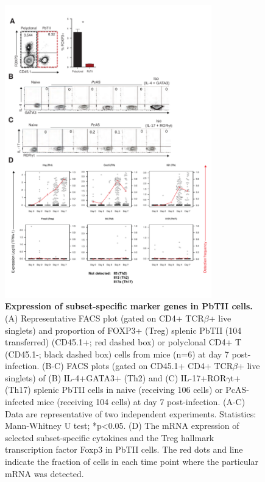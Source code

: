 \begin{figure}
    \centering
    \includegraphics[width=0.8\textwidth]{"Fig S4 rev3"}
    \caption[Expression of subset-specific marker genes in PbTII cells]{\textbf{Expression of subset-specific marker genes in PbTII cells.} (A) Representative FACS plot (gated on CD4+ TCR\( \beta \)+ live singlets) and proportion of FOXP3+ (Treg) splenic PbTII (104 transferred) (CD45.1+; red dashed box) or polyclonal CD4+ T (CD45.1-; black dashed box) cells from mice (n=6) at day 7 post-infection. (B-C) FACS plots (gated on CD45.1+ CD4+ TCR\( \beta \)+ live singlets) of (B) IL-4+GATA3+ (Th2) and (C) IL-17+ROR\( \gamma \)t+ (Th17) splenic PbTII cells in naive (receiving 106 cells) or PcAS-infected mice (receiving 104 cells) at day 7 post-infection. (A-C) Data are representative of two independent experiments. Statistics: Mann-Whitney U test; *p<0.05. (D) The mRNA expression of selected subset-specific cytokines and the Treg hallmark transcription factor Foxp3 in PbTII cells. The red dots and line indicate the fraction of cells in each time point where the particular mRNA was detected.}
    \label{fig:ms4}
\end{figure}

